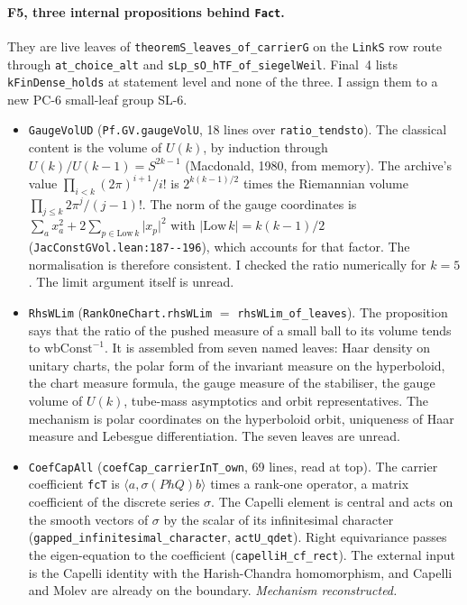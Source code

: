 \documentclass[11pt]{article}
\newcommand{\lean}[1]{\nolinkurl{#1}}
\newcommand{\Lpath}[1]{\nolinkurl{#1}}
\newcommand{\PC}[1]{PC-#1}
\theoremstyle{remark}
\begin{document}
\paragraph{F5, three internal propositions behind \lean{Fact}.} They are live leaves of \lean{theoremS_leaves_of_carrierG} on the \lean{LinkS} row route through \lean{at_choice_alt} and \lean{sLp_sO_hTF_of_siegelWeil}. Final~4 lists \lean{kFinDense_holds} at statement level and none of the three. I assign them to a new \PC{6} small-leaf group SL-6.
\begin{itemize}
\item \lean{GaugeVolUD} (\lean{Pf.GV.gaugeVolU}, 18 lines over \lean{ratio_tendsto}). The classical content is the volume of $U(k)$, by induction through $U(k)/U(k-1)=S^{2k-1}$ (Macdonald, 1980, from memory). The archive's value $\prod_{i<k}(2\pi)^{i+1}/i!$ is $2^{k(k-1)/2}$ times the Riemannian volume $\prod_{j\le k}2\pi^j/(j-1)!$. The norm of the gauge coordinates is $\sum_a x_a^2+2\sum_{p\in\mathrm{Low}\,k}\lvert x_p\rvert^2$ with $\lvert\mathrm{Low}\,k\rvert=k(k-1)/2$ (\Lpath{JacConstGVol.lean:187--196}), which accounts for that factor. The normalisation is therefore consistent. I checked the ratio numerically for $k=5$. The limit argument itself is unread.
\item \lean{RhsWLim} (\lean{RankOneChart.rhsWLim} $=$ \lean{rhsWLim_of_leaves}). The proposition says that the ratio of the pushed measure of a small ball to its volume tends to $\mathrm{wbConst}^{-1}$. It is assembled from seven named leaves: Haar density on unitary charts, the polar form of the invariant measure on the hyperboloid, the chart measure formula, the gauge measure of the stabiliser, the gauge volume of $U(k)$, tube-mass asymptotics and orbit representatives. The mechanism is polar coordinates on the hyperboloid orbit, uniqueness of Haar measure and Lebesgue differentiation. The seven leaves are unread.
\item \lean{CoefCapAll} (\lean{coefCap_carrierInT_own}, 69 lines, read at top). The carrier coefficient \lean{fcT} is $\langle a,\sigma(PhQ)b\rangle$ times a rank-one operator, a matrix coefficient of the discrete series $\sigma$. The Capelli element is central and acts on the smooth vectors of $\sigma$ by the scalar of its infinitesimal character (\lean{gapped_infinitesimal_character}, \lean{actU_qdet}). Right equivariance passes the eigen-equation to the coefficient (\lean{capelliH_cf_rect}). The external input is the Capelli identity with the Harish-Chandra homomorphism, and Capelli and Molev are already on the boundary. \emph{Mechanism reconstructed.}
\end{itemize}
\end{document}
